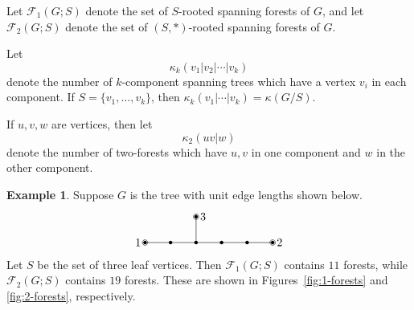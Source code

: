 \documentclass{amsart}
\theoremstyle{definition}
\newtheorem{eg}[thm]{Example}
\newcommand{\trees}{\mathcal{F}_1}
\newcommand{\forests}{\mathcal{F}}
\begin{document}
Let $\trees(G;S)$ denote the set of $S$-rooted spanning forests of $G$,
and let $\forests_2(G;S)$ denote the set of $(S,*)$-rooted spanning forests of $G$.

Let 
$$
\kappa_k(v_1|v_2| \cdots | v_k)
$$
denote the number of $k$-component spanning trees which have a vertex $v_i$ in each component.
If $S = \{v_1,\ldots, v_k\}$,
then $\kappa_k(v_1|\cdots| v_k) = \kappa(G/S)$.

If $u, v, w$ are vertices, then let
$$
\kappa_2(u v | w)
$$
denote the number of two-forests which have $u, v$ in one component and $w$ in the other component.

\begin{eg}
Suppose $G$ is the tree with unit edge lengths shown below.
\[
\begin{tikzpicture}[scale=0.8]
	\coordinate (1) at (0,0);
	\coordinate (A) at (1,0);
	\coordinate (B) at (2,0);
	\coordinate (C) at (3,0);
	\coordinate (D) at (4,0);
	\coordinate (2) at (5,0);
	\coordinate (3) at (2,1);
	
	\foreach \c in {1,2,3,A,B,C,D} {
		\fill (\c) circle (2pt);
	}
	\foreach \c in {1,2,3} {
		\draw (\c) circle (3pt);
	}

	\draw (1) -- (A);
	\draw (A) -- (B);
	\draw (B) -- (3);
	\draw (B) -- (C);
	\draw (C) -- (D);
	\draw (D) -- (2);
	
	\foreach \c/\d in {1/left,2/right,3/right} {
		\node[\d=0.2] at (\c) {$\c$};
	}
\end{tikzpicture}
\]
Let $S$ be the set of three leaf vertices.
Then $\trees(G;S)$ contains $11$ forests,
while $\forests_2(G;S)$ contains $19$ forests.
These are shown in Figures~\ref{fig:1-forests} and \ref{fig:2-forests}, respectively.
\end{eg}
\end{document}
